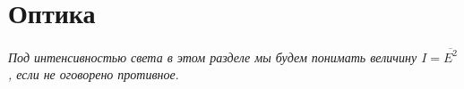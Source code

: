 \documentclass[a4paper,12pt]{article}
\begin{document}

\newpage

\newpage

\newpage

\newpage

\newpage

\newpage

\newpage

\newpage

\newpage

\newpage

\newpage

\newpage

\newpage

\newpage

\part{Оптика}

\textit{Под интенсивностью света в этом разделе мы будем понимать величину $I = \overline{E^2}$, если не оговорено противное}.

\newpage

\newpage

\newpage

\newpage

\newpage

\end{document}
